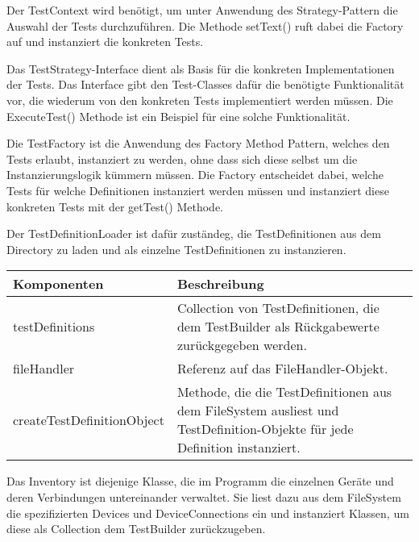 \documentclass[]{subfiles}
\begin{document}
	Der TestContext wird benötigt, um unter Anwendung des Strategy-Pattern die Auswahl der Tests durchzuführen.
	Die Methode setText() ruft dabei die Factory auf und instanziert die konkreten Tests.

	Das TestStrategy-Interface dient als Basis für die konkreten Implementationen der Tests. 
	Das Interface gibt den Test-Classes dafür die benötigte Funktionalität vor, die wiederum von den konkreten Tests implementiert werden müssen.
	Die ExecuteTest() Methode ist ein Beispiel für eine solche Funktionalität.

	Die TestFactory ist die Anwendung des Factory Method Pattern, welches den Tests erlaubt, instanziert zu werden, ohne dass sich diese selbst um die Instanzierungslogik kümmern müssen.
	Die Factory entscheidet dabei, welche Tests für welche Definitionen instanziert werden müssen und instanziert diese konkreten Tests mit der getTest() Methode.

	\newpage

	Der TestDefinitionLoader ist dafür zuständeg, die TestDefinitionen aus dem Directory zu laden und als einzelne TestDefinitionen zu instanzieren.
	
	\begin{tabularx}{\textwidth}{lX}
		\toprule
			Komponenten & Beschreibung \\
		\midrule
			testDefinitions & Collection von TestDefinitionen, die dem TestBuilder als Rückgabewerte zurückgegeben werden. \\
			fileHandler & Referenz auf das FileHandler-Objekt. \\
		\midrule
			createTestDefinitionObject & Methode, die die TestDefinitionen aus dem FileSystem ausliest und TestDefinition-Objekte für jede Definition instanziert. \\
		\bottomrule
	\end{tabularx}

	Das Inventory ist diejenige Klasse, die im Programm die einzelnen Geräte und deren Verbindungen untereinander verwaltet. 
	Sie liest dazu aus dem FileSystem die spezifizierten Devices und DeviceConnections ein und instanziert Klassen, um diese als Collection dem TestBuilder zurückzugeben.
\end{document}
